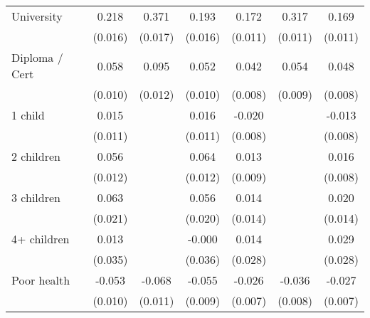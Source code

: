{\begin{tabular}{l*{6}{c}}
University          &       0.218\sym{***}&       0.371\sym{***}&       0.193\sym{***}&       0.172\sym{***}&       0.317\sym{***}&       0.169\sym{***}\\
                    &     (0.016)         &     (0.017)         &     (0.016)         &     (0.011)         &     (0.011)         &     (0.011)         \\
Diploma / Cert      &       0.058\sym{***}&       0.095\sym{***}&       0.052\sym{***}&       0.042\sym{***}&       0.054\sym{***}&       0.048\sym{***}\\
                    &     (0.010)         &     (0.012)         &     (0.010)         &     (0.008)         &     (0.009)         &     (0.008)         \\
1 child             &       0.015         &                     &       0.016         &      -0.020\sym{***}&                     &      -0.013         \\
                    &     (0.011)         &                     &     (0.011)         &     (0.008)         &                     &     (0.008)         \\
2 children          &       0.056\sym{***}&                     &       0.064\sym{***}&       0.013         &                     &       0.016\sym{*}  \\
                    &     (0.012)         &                     &     (0.012)         &     (0.009)         &                     &     (0.008)         \\
3 children          &       0.063\sym{***}&                     &       0.056\sym{***}&       0.014         &                     &       0.020         \\
                    &     (0.021)         &                     &     (0.020)         &     (0.014)         &                     &     (0.014)         \\
4+ children         &       0.013         &                     &      -0.000         &       0.014         &                     &       0.029         \\
                    &     (0.035)         &                     &     (0.036)         &     (0.028)         &                     &     (0.028)         \\
Poor health         &      -0.053\sym{***}&      -0.068\sym{***}&      -0.055\sym{***}&      -0.026\sym{***}&      -0.036\sym{***}&      -0.027\sym{***}\\
                    &     (0.010)         &     (0.011)         &     (0.009)         &     (0.007)         &     (0.008)         &     (0.007)         \\

\end{tabular}}
